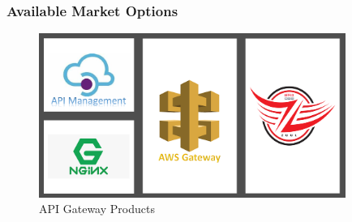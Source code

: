 \documentclass{beamer}
\begin{document}
		\begin{frame}
			\frametitle{Available Market Options}
			\vspace{10mm}
				\begin{figure}[h]
					\includegraphics[width=100mm, scale=2]{img/gtws.png}
					\caption{API Gateway Products}
				\end{figure}\vspace{20mm}
			
	\end{frame}
		
	
	
\end{document}
